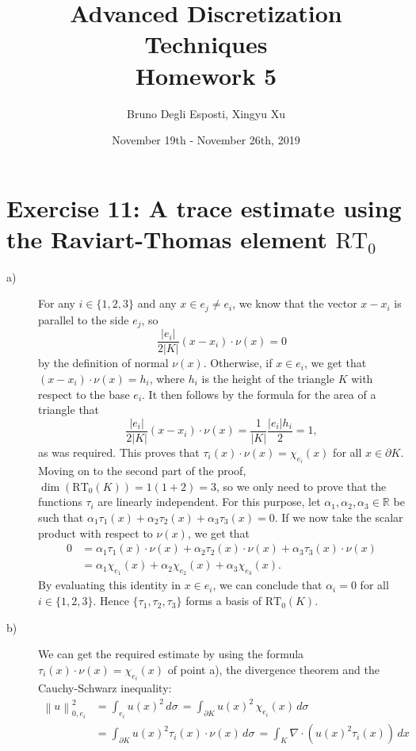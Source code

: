 \documentclass[a4paper]{article}
\title{\huge{Advanced Discretization Techniques \\ Homework 5}}
\author{\Large{Bruno Degli Esposti, Xingyu Xu}}
\date{November 19th - November 26th, 2019}
\newcommand{\dx}{\, dx \,}
\newcommand{\dsigma}{\, d\sigma \,}
\newcommand{\area}[1]{\left\lvert #1 \right\rvert}
\newcommand{\abs}[1]{\left\lvert #1 \right\rvert}
\newcommand{\norm}[1]{\left\lVert #1 \right\rVert}
\newcommand{\R}{\mathbb{R}}
\begin{document}
\maketitle

\section*{Exercise 11: A trace estimate using the Raviart-Thomas element $\text{RT}_0$}
\begin{description}
\item[a)] For any $i \in \{1,2,3\}$ and any $x \in e_j \neq e_i$,
	we know that the vector $x-x_i$ is parallel to the side $e_j$, so
	\[
	\frac{\abs{e_i}}{2\area{K}}(x-x_i) \cdot \nu(x) = 0
	\]
	by the definition of normal $\nu(x)$.
	Otherwise, if $x \in e_i$, we get that $(x-x_i) \cdot \nu(x) = h_i$,
	where $h_i$ is the height of the triangle $K$ with respect to the base $e_i$.
	It then follows by the formula for the area of a triangle that
	\[
	\frac{\abs{e_i}}{2\area{K}}(x-x_i) \cdot \nu(x)
	= \frac{1}{\area{K}} \frac{\abs{e_i}h_i}{2}
	= 1,
	\]
	as was required. This proves that $\tau_i(x)\cdot\nu(x)=\chi_{e_i}(x)$
	for all $x \in \partial K$. Moving on to the second part of the proof,
	$\dim(\text{RT}_0(K)) = 1(1+2) = 3$, so we only need to prove
	that the functions $\tau_i$ are linearly independent.
	For this purpose, let $\alpha_1,\alpha_2,\alpha_3 \in \R$ be
	such that $\alpha_1\tau_1(x)+\alpha_2\tau_2(x)+\alpha_3\tau_3(x) = 0$.
	If we now take the scalar product with respect to $\nu(x)$, we get that
	\begin{align*}
	0
&	= \alpha_1\tau_1(x)\cdot\nu(x)
	+ \alpha_2\tau_2(x)\cdot\nu(x)
	+ \alpha_3\tau_3(x)\cdot\nu(x) \\
&	= \alpha_1\chi_{e_1}(x)+\alpha_2\chi_{e_2}(x)+\alpha_3\chi_{e_3}(x).
	\end{align*}
	By evaluating this identity in $x \in e_i$,
	we can conclude that $\alpha_i = 0$ for all $i \in \{1,2,3\}$.
	Hence $\{\tau_1,\tau_2,\tau_3\}$ forms a basis of $\text{RT}_0(K)$.
\item[b)] We can get the	required estimate by using the formula
	$\tau_i(x)\cdot\nu(x)=\chi_{e_i}(x)$ of point a),
	the divergence theorem and the Cauchy-Schwarz inequality:
	\begin{align*}
	\norm{u}_{0,e_i}^2
&	= \int_{e_i} u(x)^2 \dsigma
	= \int_{\partial K} u(x)^2 \, \chi_{e_i}(x) \dsigma \\
&	= \int_{\partial K} u(x)^2 \tau_i(x)\cdot\nu(x) \dsigma
	= \int_K \nabla\!\cdot(u(x)^2\tau_i(x)) \dx \\

\end{align*}
\end{description}
\end{document}
